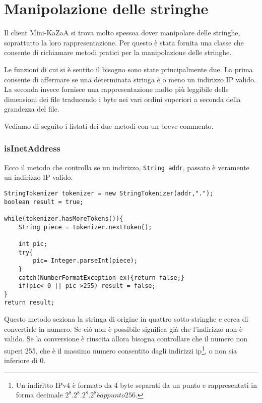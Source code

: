 \section{Manipolazione delle stringhe}
Il client Mini-KaZaA si trova molto spessoa dover manipolare delle stringhe, soprattutto la loro rappresentazione. Per questo è stata fornita una classe che consente di richiamare metodi pratici per la manipolazione delle stringhe.

Le funzioni di cui si è sentito il bisogno sono state principalmente due.
La prima consente di affermare se una determinata stringa è o meno un indirizzo IP valido.
La seconda invece fornisce una rappresentazione molto più leggibile delle dimensioni dei file traducendo i byte nei vari ordini superiori a seconda della grandezza del file.

Vediamo di seguito i listati dei due metodi con un breve commento.

\subsubsection{isInetAddress}
Ecco il metodo che controlla se un indirizzo, \verb|String addr|, passato è veramente un indirizzo IP valido.
\begin{lstlisting}
StringTokenizer tokenizer = new StringTokenizer(addr,".");
boolean result = true;

while(tokenizer.hasMoreTokens()){
	String piece = tokenizer.nextToken();
	
	int pic;
	try{
		pic= Integer.parseInt(piece);
	}
	catch(NumberFormatException ex){return false;}
	if(pic< 0 || pic >255) result = false;
}
return result;
\end{lstlisting}
Questo metodo seziona la stringa di origine in quattro sotto-stringhe e cerca di convertirle in numero.
Se ciò non è possibile significa già che l'indirizzo non è valido.
Se la conversione è riuscita allora bisogna controllare che il numero non superi 255, che è il massimo numero consentito dagli indirizzi ip\footnote{Un indiritto IPv4 è formato da 4 byte separati da un punto e rappresentati in forma decimale $2^8 . 2^8 . 2^8 . 2^8 è appunto 256.$}, o non sia inferiore di 0.

